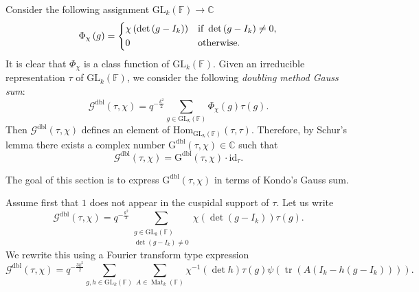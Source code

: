 \documentclass[12pt, reqno]{amsart}
\theoremstyle{definition}
\theoremstyle{definition}
\theoremstyle{definition}
\newcommand{\cComplex}{\mathbb{C}}
\newcommand{\Hom}{\mathrm{Hom}}
\newcommand{\idmap}{\mathrm{id}}
\newcommand{\fieldCharacter}{\psi}
\newcommand{\IdentityMatrix}[1]{I_{#1}}
\newcommand{\trace}{\operatorname{tr}}
\newcommand{\GL}{\mathrm{GL}}
\newcommand{\finiteField}{\mathbb{F}}
\newcommand{\squareMatrix}{\operatorname{Mat}}
\newcommand{\dblGaussSum}[2]{\mathcal{G}^{\mathrm{dbl}}\left(#1, #2\right)}
\newcommand{\dblGaussSumScalar}[2]{\mathrm{G}^{\mathrm{dbl}}\left(#1, #2\right)}
\begin{document}
Consider the following assignment $\GL_k\left(\finiteField\right) \to \cComplex$
$$\Phi_{\chi}\left(g\right) = \begin{dcases}
	\chi\left(\det\left(g-\IdentityMatrix{k}\right)\right) & \text{if }\det\left(g-\IdentityMatrix{k}\right) \ne 0,\\
	0 & \text{otherwise.}
\end{dcases}$$
It is clear that $\Phi_{\chi}$ is a class function of $\GL_k\left(\finiteField\right)$. Given an irreducible representation $\tau$ of $\GL_k\left(\finiteField\right)$, we consider the following \emph{doubling method Gauss sum}:
$$\dblGaussSum{\tau}{\chi} = q^{-\frac{k^2}{2}} \sum_{g \in \GL_k\left(\finiteField\right)} \Phi_{\chi}\left(g\right) \tau\left(g\right).$$
Then $\dblGaussSum{\tau}{\chi}$ defines an element of $\Hom_{\GL_k\left(\finiteField\right)}\left(\tau, \tau\right)$. Therefore, by Schur's lemma there exists a complex number $\dblGaussSumScalar{\tau}{\chi} \in \cComplex$ such that $$\dblGaussSum{\tau}{\chi} = \dblGaussSumScalar{\tau}{\chi} \cdot \idmap_\tau.$$ 

The goal of this section is to express $\dblGaussSumScalar{\tau}{\chi}$ in terms of Kondo's Gauss sum.

Assume first that $1$ does not appear in the cuspidal support of $\tau$. Let us write
$$\dblGaussSum{\tau}{\chi} = q^{-\frac{k^2}{2}} \sum_{\substack{g \in \GL_k\left(\finiteField\right) \\
		\det\left(g - \IdentityMatrix{k}\right) \ne 0}} \chi\left(\det\left(g - \IdentityMatrix{k}\right)\right) \tau\left(g\right).$$
We rewrite this using a Fourier transform type expression
$$\dblGaussSum{\tau}{\chi} = q^{-\frac{3k^2}{2}} \sum_{g, h \in \GL_k\left(\finiteField\right)} \sum_{A \in \squareMatrix_k\left(\finiteField\right)} \chi^{-1}\left(\det h\right) \tau\left(g\right) \fieldCharacter\left(\trace\left(A \left(\IdentityMatrix{k} - h \left(g - \IdentityMatrix{k}\right)\right)\right)\right).$$
\end{document}
